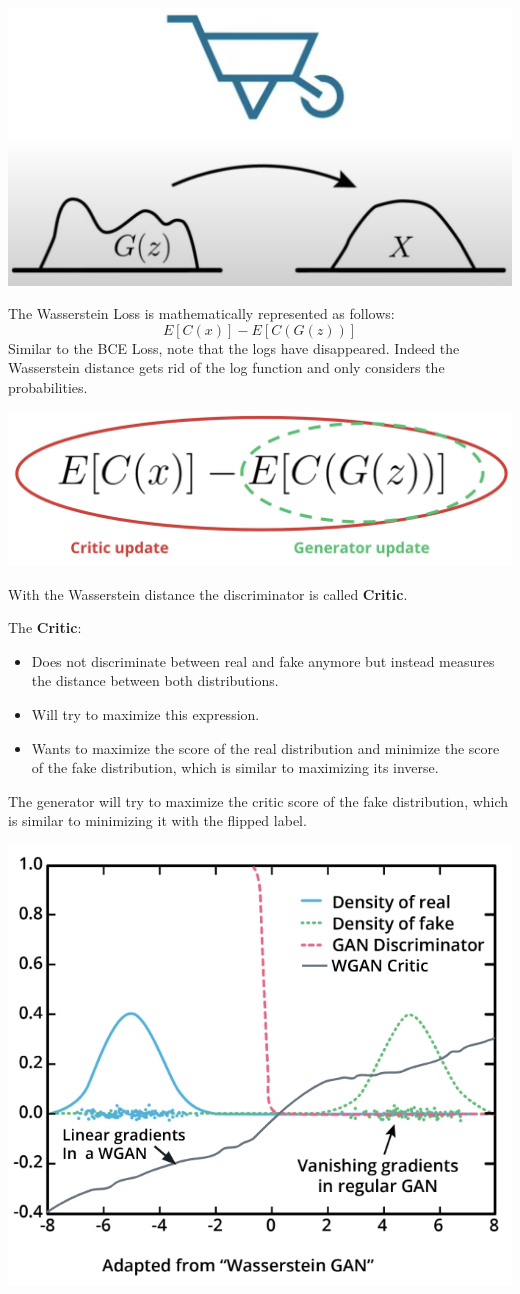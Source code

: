 \includegraphics[width=0.5\linewidth]{img//genAdvNet//modernGAN/eathMoversDistance.png}

The Wasserstein Loss is mathematically represented as follows: \[E[C(x)] - E[C(G(z))]\]
Similar to the BCE Loss, note that the logs have disappeared. Indeed the Wasserstein distance gets rid of the log function and only considers the probabilities.

\includegraphics[width=0.5\linewidth]{img//genAdvNet//modernGAN/screen-shot-2022-06-29-at-4.29.11-pm.jpeg}

With the Wasserstein distance the discriminator is called \textbf{Critic}. \newline

The \textbf{Critic}:
\begin{itemize}
    \item Does not discriminate between real and fake anymore but instead measures the distance between both distributions.
    \item Will try to maximize this expression.
    \item Wants to maximize the score of the real distribution and minimize the score of the fake distribution, which is similar to maximizing its inverse.
\end{itemize}
The generator will try to maximize the critic score of the fake distribution, which is similar to minimizing it with the flipped label.

\includegraphics[width=0.75\linewidth]{img//genAdvNet//modernGAN/screen-shot-2022-06-29-at-4.33.14-pm.jpeg}

